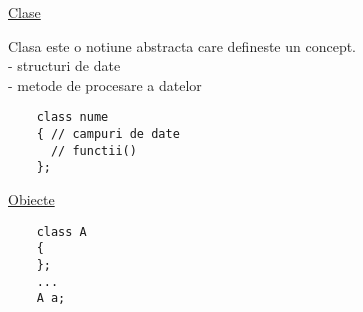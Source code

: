 \documentclass[12pt]{extarticle}
\begin{document}
  \huge{\underline{Clase}} \\
	{\large
    Clasa este o notiune abstracta care defineste un concept. \\
    - structuri de date \\
    - metode de procesare a datelor \\
    \begin{verbatim}
    class nume
    { // campuri de date
      // functii()
    };
    \end{verbatim}
    \underline{Obiecte} \\
    \begin {verbatim}
    class A
    {
    };
    ...
    A a;
    \end{verbatim}
	}
\end{document}
